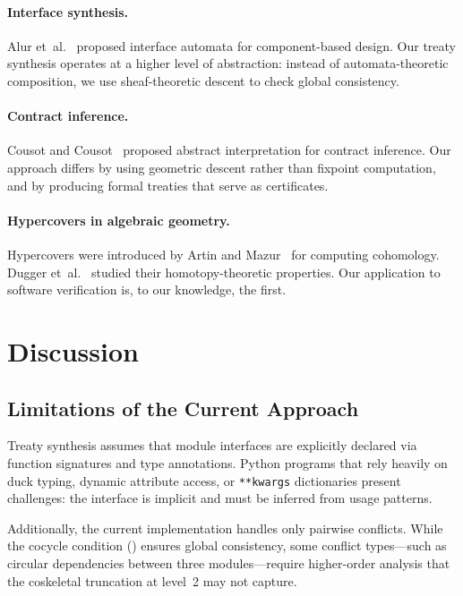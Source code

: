 \documentclass[11pt]{article}
\begin{document}
\paragraph{Interface synthesis.}
Alur et~al.~\cite{alur-interfaces} proposed interface automata for
component-based design.  Our treaty synthesis operates at a higher
level of abstraction: instead of automata-theoretic composition,
we use sheaf-theoretic descent to check global consistency.

\paragraph{Contract inference.}
Cousot and Cousot~\cite{cousot-abstract} proposed abstract
interpretation for contract inference.  Our approach differs by
using geometric descent rather than fixpoint computation, and by
producing formal treaties that serve as certificates.

\paragraph{Hypercovers in algebraic geometry.}
Hypercovers were introduced by Artin and
Mazur~\cite{artin-mazur} for computing cohomology.
Dugger et~al.~\cite{dugger-hypercovers} studied their
homotopy-theoretic properties.  Our application to software
verification is, to our knowledge, the first.

\section{Discussion}\label{sec:discussion}

\subsection{Limitations of the Current Approach}

Treaty synthesis assumes that module interfaces are explicitly
declared via function signatures and type annotations.  Python
programs that rely heavily on duck typing, dynamic attribute access,
or \texttt{**kwargs} dictionaries present challenges: the interface
is implicit and must be inferred from usage patterns.

Additionally, the current implementation handles only pairwise
conflicts.  While the cocycle condition () ensures
global consistency, some conflict types---such as circular
dependencies between three modules---require higher-order analysis
that the coskeletal truncation at level~2 may not capture.
\end{document}
